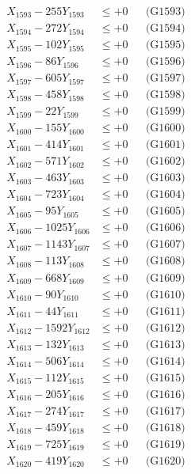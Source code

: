 \documentclass[a4paper,10pt]{article}
\begin{document}
{\begin{align}
X_{1593} - 255Y_{1593} &\leq +0 && \text{(G1593)} \\
X_{1594} - 272Y_{1594} &\leq +0 && \text{(G1594)} \\
X_{1595} - 102Y_{1595} &\leq +0 && \text{(G1595)} \\
X_{1596} - 86Y_{1596} &\leq +0 && \text{(G1596)} \\
X_{1597} - 605Y_{1597} &\leq +0 && \text{(G1597)} \\
X_{1598} - 458Y_{1598} &\leq +0 && \text{(G1598)} \\
X_{1599} - 22Y_{1599} &\leq +0 && \text{(G1599)} \\
X_{1600} - 155Y_{1600} &\leq +0 && \text{(G1600)} \\
\allowbreak
X_{1601} - 414Y_{1601} &\leq +0 && \text{(G1601)} \\
X_{1602} - 571Y_{1602} &\leq +0 && \text{(G1602)} \\
X_{1603} - 463Y_{1603} &\leq +0 && \text{(G1603)} \\
X_{1604} - 723Y_{1604} &\leq +0 && \text{(G1604)} \\
X_{1605} - 95Y_{1605} &\leq +0 && \text{(G1605)} \\
X_{1606} - 1025Y_{1606} &\leq +0 && \text{(G1606)} \\
X_{1607} - 1143Y_{1607} &\leq +0 && \text{(G1607)} \\
X_{1608} - 113Y_{1608} &\leq +0 && \text{(G1608)} \\
X_{1609} - 668Y_{1609} &\leq +0 && \text{(G1609)} \\
X_{1610} - 90Y_{1610} &\leq +0 && \text{(G1610)} \\
\allowbreak
X_{1611} - 44Y_{1611} &\leq +0 && \text{(G1611)} \\
X_{1612} - 1592Y_{1612} &\leq +0 && \text{(G1612)} \\
X_{1613} - 132Y_{1613} &\leq +0 && \text{(G1613)} \\
X_{1614} - 506Y_{1614} &\leq +0 && \text{(G1614)} \\
X_{1615} - 112Y_{1615} &\leq +0 && \text{(G1615)} \\
X_{1616} - 205Y_{1616} &\leq +0 && \text{(G1616)} \\
X_{1617} - 274Y_{1617} &\leq +0 && \text{(G1617)} \\
X_{1618} - 459Y_{1618} &\leq +0 && \text{(G1618)} \\
X_{1619} - 725Y_{1619} &\leq +0 && \text{(G1619)} \\
X_{1620} - 419Y_{1620} &\leq +0 && \text{(G1620)} \\

\end{align}}
\end{document}
